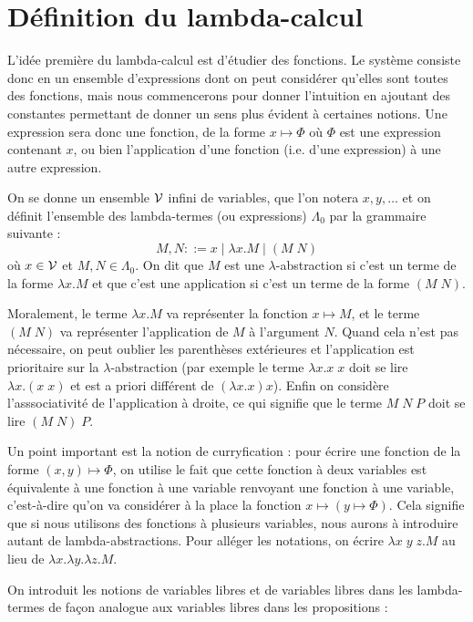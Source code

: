 \section{Définition du lambda-calcul}

L'idée première du lambda-calcul est d'étudier des fonctions. Le système consiste donc en un ensemble d'expressions dont on peut considérer qu'elles sont toutes des fonctions, mais nous commencerons pour donner l'intuition en ajoutant des constantes permettant de donner un sens plus évident à certaines notions. Une expression sera donc une fonction, de la forme $x\mapsto \Phi$ où $\Phi$ est une expression contenant $x$, ou bien l'application d'une fonction (i.e. d'une expression) à une autre expression.

\begin{defi}
    On se donne un ensemble $\mathcal V$ infini de variables, que l'on notera $x,y,\ldots$ et on définit l'ensemble des lambda-termes (ou expressions) $\Lambda_0$ par la grammaire suivante : $$M,N ::= x \mid \lambda x.M\mid (M\;N)$$ où $x\in\mathcal V$ et $M,N\in\Lambda_0$. On dit que $M$ est une $\lambda$-abstraction si c'est un terme de la forme $\lambda x.M$ et que c'est une application si c'est un terme de la forme $(M\;N)$.
\end{defi}

Moralement, le terme $\lambda x.M$ va représenter la fonction $x\mapsto M$, et le terme $(M\;N)$ va représenter l'application de $M$ à l'argument $N$. Quand cela n'est pas nécessaire, on peut oublier les parenthèses extérieures et l'application est prioritaire sur la $\lambda$-abstraction (par exemple le terme $\lambda x.x\;x$ doit se lire $\lambda x.(x\;x)$ et est a priori différent de $(\lambda x.x)x$). Enfin on considère l'asssociativité de l'application à droite, ce qui signifie que le terme $M\;N\;P$ doit se lire $(M\;N)\;P$.

Un point important est la notion de curryfication : pour écrire une fonction de la forme $(x,y)\mapsto \Phi$, on utilise le fait que cette fonction à deux variables est équivalente à une fonction à une variable renvoyant une fonction à une variable, c'est-à-dire qu'on va considérer à la place la fonction $x\mapsto (y\mapsto \Phi)$. Cela signifie que si nous utilisons des fonctions à plusieurs variables, nous aurons à introduire autant de lambda-abstractions. Pour alléger les notations, on écrire $\lambda x\;y\;z.M$ au lieu de $\lambda x.\lambda y.\lambda z.M$.

On introduit les notions de variables libres et de variables libres dans les lambda-termes de façon analogue aux variables libres dans les propositions :

